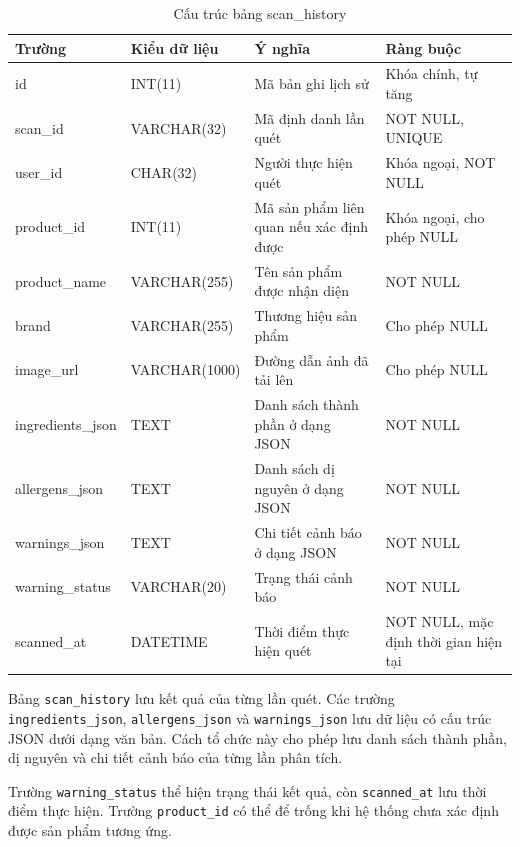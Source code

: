 \begin{table}[H]
	\centering
	\caption{Cấu trúc bảng scan\_history}
	\label{tab:scan-history}
	\scriptsize
	\begin{tabularx}{\textwidth}{|l|l|X|l|}
		\hline
		\textbf{Trường} & \textbf{Kiểu dữ liệu} & \textbf{Ý nghĩa} & \textbf{Ràng buộc} \\
		\hline
		id & INT(11) & Mã bản ghi lịch sử & Khóa chính, tự tăng \\
		\hline
		scan\_id & VARCHAR(32) & Mã định danh lần quét & NOT NULL, UNIQUE \\
		\hline
		user\_id & CHAR(32) & Người thực hiện quét & Khóa ngoại, NOT NULL \\
		\hline
		product\_id & INT(11) & Mã sản phẩm liên quan nếu xác định được & Khóa ngoại, cho phép NULL \\
		\hline
		product\_name & VARCHAR(255) & Tên sản phẩm được nhận diện & NOT NULL \\
		\hline
		brand & VARCHAR(255) & Thương hiệu sản phẩm & Cho phép NULL \\
		\hline
		image\_url & VARCHAR(1000) & Đường dẫn ảnh đã tải lên & Cho phép NULL \\
		\hline
		ingredients\_json & TEXT & Danh sách thành phần ở dạng JSON & NOT NULL \\
		\hline
		allergens\_json & TEXT & Danh sách dị nguyên ở dạng JSON & NOT NULL \\
		\hline
		warnings\_json & TEXT & Chi tiết cảnh báo ở dạng JSON & NOT NULL \\
		\hline
		warning\_status & VARCHAR(20) & Trạng thái cảnh báo & NOT NULL \\
		\hline
		scanned\_at & DATETIME & Thời điểm thực hiện quét & NOT NULL, mặc định thời gian hiện tại \\
		\hline
	\end{tabularx}
\end{table}

Bảng \texttt{scan\_history} lưu kết quả của từng lần quét. Các trường \texttt{ingredients\_json}, \texttt{allergens\_json} và \texttt{warnings\_json} lưu dữ liệu có cấu trúc JSON dưới dạng văn bản. Cách tổ chức này cho phép lưu danh sách thành phần, dị nguyên và chi tiết cảnh báo của từng lần phân tích.

Trường \texttt{warning\_status} thể hiện trạng thái kết quả, còn \texttt{scanned\_at} lưu thời điểm thực hiện. Trường \texttt{product\_id} có thể để trống khi hệ thống chưa xác định được sản phẩm tương ứng.

